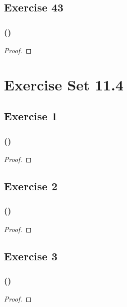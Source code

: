 \documentclass[14pt]{extarticle}
\begin{document}
\subsection{Exercise 43}

\subsubsection{()}

\begin{proof}

\end{proof}

\section{Exercise Set 11.4}

\subsection{Exercise 1}

\subsubsection{()}

\begin{proof}

\end{proof}

\subsection{Exercise 2}

\subsubsection{()}

\begin{proof}

\end{proof}

\subsection{Exercise 3}

\subsubsection{()}

\begin{proof}

\end{proof}
\end{document}
